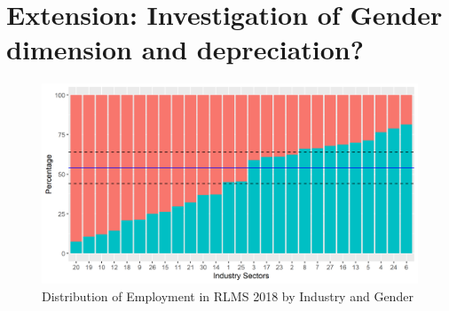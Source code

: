 \documentclass[12pt,a4paper]{article}
\begin{document}
\section{Extension: Investigation of Gender dimension and depreciation?}



\begin{figure}[H]
     \centering
     \hspace*{-0.7in}
     \includegraphics{gen_ind18.png}
  \caption{Distribution of Employment in RLMS 2018 by Industry and Gender}\label{fig:5}
\end{figure}
\end{document}
